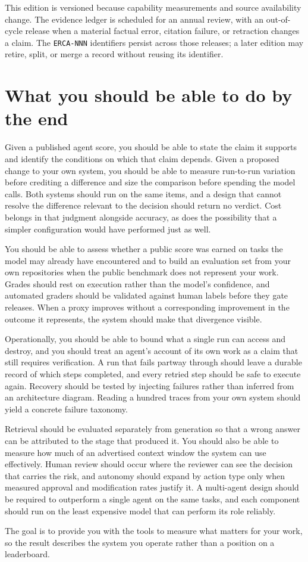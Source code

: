 This edition is versioned because capability measurements and source availability change. The evidence ledger is scheduled for an annual review, with an out-of-cycle release when a material factual error, citation failure, or retraction changes a claim. The \texttt{ERCA-NNN} identifiers persist across those releases; a later edition may retire, split, or merge a record without reusing its identifier.

\hypertarget{what-you-should-be-able-to-do-by-the-end}{%
\section{What you should be able to do by the end}\label{what-you-should-be-able-to-do-by-the-end}}

Given a published agent score, you should be able to state the claim it supports and identify the conditions on which that claim depends. Given a proposed change to your own system, you should be able to measure run-to-run variation before crediting a difference and size the comparison before spending the model calls. Both systems should run on the same items, and a design that cannot resolve the difference relevant to the decision should return no verdict. Cost belongs in that judgment alongside accuracy, as does the possibility that a simpler configuration would have performed just as well.

You should be able to assess whether a public score was earned on tasks the model may already have encountered and to build an evaluation set from your own repositories when the public benchmark does not represent your work. Grades should rest on execution rather than the model's confidence, and automated graders should be validated against human labels before they gate releases. When a proxy improves without a corresponding improvement in the outcome it represents, the system should make that divergence visible.

Operationally, you should be able to bound what a single run can access and destroy, and you should treat an agent's account of its own work as a claim that still requires verification. A run that fails partway through should leave a durable record of which steps completed, and every retried step should be safe to execute again. Recovery should be tested by injecting failures rather than inferred from an architecture diagram. Reading a hundred traces from your own system should yield a concrete failure taxonomy.

Retrieval should be evaluated separately from generation so that a wrong answer can be attributed to the stage that produced it. You should also be able to measure how much of an advertised context window the system can use effectively. Human review should occur where the reviewer can see the decision that carries the risk, and autonomy should expand by action type only when measured approval and modification rates justify it. A multi-agent design should be required to outperform a single agent on the same tasks, and each component should run on the least expensive model that can perform its role reliably.

The goal is to provide you with the tools to measure what matters for your work, so the result describes the system you operate rather than a position on a leaderboard.
